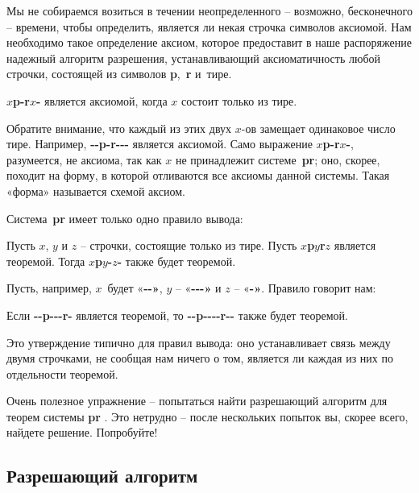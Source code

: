 \documentclass[../main.tex]{subfiles}
\begin{document}
Мы не собираемся возиться в течении неопределенного \--- возможно, бесконечного \--- времени, чтобы определить, является ли некая строчка символов аксиомой.
Нам необходимо такое определение аксиом, которое предоставит в наше распоряжение надежный алгоритм разрешения, устанавливающий аксиоматичность любой строчки, состоящей из символов \textbf{p},~\textbf{r} и~тире.

\begin{tcolorbox}[title={ОПРЕДЕЛЕНИЕ}]
    \textbf{$x$p-r$x$-} является аксиомой, когда $x$ состоит только из тире.
\end{tcolorbox}

Обратите внимание, что каждый из этих двух $x$-ов замещает одинаковое число тире.
Например, \textbf{-{}-p-r-{}-{}-} является аксиомой.
Само выражение \textbf{$x$p-r$x$-}, разумеется, не аксиома, так как $x$ не принадлежит системе~\textbf{pr}; оно, скорее, походит на форму, в которой отливаются все аксиомы данной системы.
Такая «форма» называется схемой аксиом.

Система~\textbf{pr} имеет только одно правило вывода:

\begin{tcolorbox}[title={ПРАВИЛО}]
    Пусть $x$, $y$ и $z$ \--- строчки, состоящие только из тире.
    Пусть \textbf{$x$p$y$r$z$} является теоремой.
    Тогда \textbf{$x$p$y$-$z$-} также будет теоремой.
\end{tcolorbox}

\noindent
Пусть, например, $x$~будет «\textbf{-{}-»}, $y$ \--- «\textbf{-{}-{}-»} и $z$ \--- «\textbf{-»}.
Правило говорит нам:

\begin{block}
    Если \textbf{-{}-p-{}-{}-r-} является теоремой, то \textbf{-{}-p-{}-{}-{}-r-{}-} также будет теоремой.
\end{block}

Это утверждение типично для правил вывода: оно устанавливает связь между двумя строчками, не сообщая нам ничего о том, является ли каждая из них по отдельности теоремой.

Очень полезное упражнение \--- попытаться найти разрешающий алгоритм для теорем системы \textbf{pr} . Это нетрудно \--- после нескольких попыток вы, скорее всего, найдете решение. Попробуйте!


\subsection{Разрешающий алгоритм}
\end{document}
